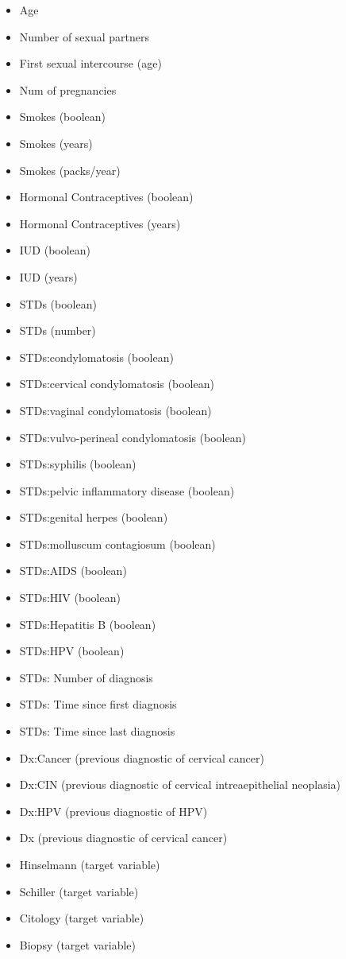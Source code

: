 \begin{itemize}
    \item Age
    \item Number of sexual partners
    \item First sexual intercourse (age)
    \item Num of pregnancies
    \item Smokes (boolean)
    \item Smokes (years)
    \item Smokes (packs/year)
    \item Hormonal Contraceptives (boolean)
    \item Hormonal Contraceptives (years)
    \item IUD (boolean)
    \item IUD (years)
    \item STDs (boolean)
    \item STDs (number)
    \item STDs:condylomatosis (boolean)
    \item STDs:cervical condylomatosis (boolean)
    \item STDs:vaginal condylomatosis (boolean)
    \item STDs:vulvo-perineal condylomatosis (boolean)
    \item STDs:syphilis (boolean)
    \item STDs:pelvic inflammatory disease (boolean)
    \item STDs:genital herpes (boolean)
    \item STDs:molluscum contagiosum (boolean)
    \item STDs:AIDS (boolean)
    \item STDs:HIV (boolean)
    \item STDs:Hepatitis B (boolean)
    \item STDs:HPV (boolean)
    \item STDs: Number of diagnosis
    \item STDs: Time since first diagnosis
    \item STDs: Time since last diagnosis
    \item Dx:Cancer (previous diagnostic of cervical cancer)
    \item Dx:CIN (previous diagnostic of cervical intreaepithelial neoplasia)
    \item Dx:HPV (previous diagnostic of HPV)
    \item Dx (previous diagnostic of cervical cancer)
    \item Hinselmann (target variable)
    \item Schiller (target variable)
    \item Citology (target variable)
    \item Biopsy (target variable)
\end{itemize}

